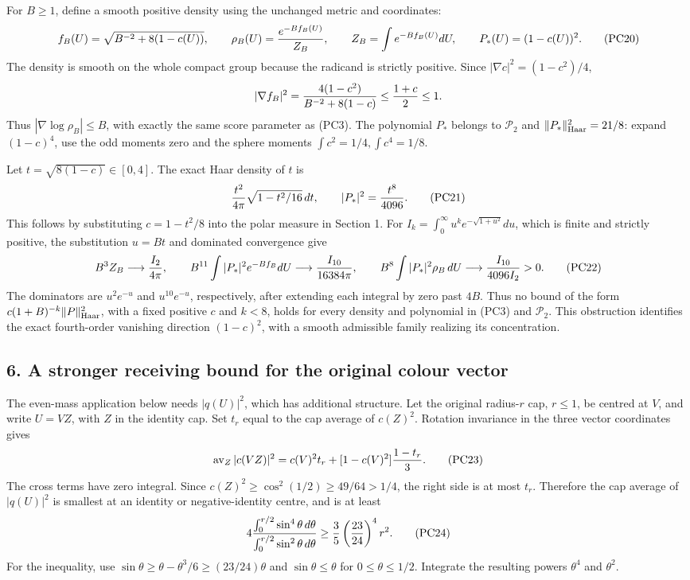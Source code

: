 \documentclass[11pt]{article}
\begin{document}
For \(B\ge1\), define a smooth positive density using the unchanged
metric and coordinates:
\[
 f_B(U)=\sqrt{B^{-2}+8(1-c(U))},\qquad
 \rho_B(U)={e^{-Bf_B(U)}\over Z_B},\qquad
 Z_B=\int e^{-Bf_B(U)}dU,\qquad P_*(U)=(1-c(U))^2.
 \tag{PC20}
\]
The density is smooth on the whole compact group because the radicand
is strictly positive. Since
\(|\nabla c|^2=(1-c^2)/4\),
\[
 |\nabla f_B|^2
 ={4(1-c^2)\over B^{-2}+8(1-c)}
 \le{1+c\over2}\le1.
\]
Thus \(|\nabla\log\rho_B|\le B\), with exactly the same score
parameter as (PC3). The polynomial \(P_*\) belongs to
\(\mathcal P_2\) and \(\|P_*\|_{\rm Haar}^2=21/8\):
expand \((1-c)^4\), use the odd moments zero and the sphere
moments \(\int c^2=1/4,\int c^4=1/8\).

Let \(t=\sqrt{8(1-c)}\in[0,4]\). The exact Haar density of \(t\)
is
\[
 {t^2\over4\pi}\sqrt{1-t^2/16}\,dt,\qquad
 |P_*|^2={t^8\over4096}.
 \tag{PC21}
\]
This follows by substituting \(c=1-t^2/8\) into the polar measure
in Section 1. For \(I_k=\int_0^\infty u^k e^{-\sqrt{1+u^2}}du\),
which is finite and strictly positive, the substitution \(u=Bt\)
and dominated convergence give
\[
 B^3Z_B\longrightarrow {I_2\over4\pi},\qquad
 B^{11}\int|P_*|^2e^{-Bf_B}dU
                  \longrightarrow {I_{10}\over16384\pi},
 \qquad
 B^8\int|P_*|^2\rho_B\,dU
                  \longrightarrow {I_{10}\over4096I_2}>0.
 \tag{PC22}
\]
The dominators are \(u^2e^{-u}\) and \(u^{10}e^{-u}\),
respectively, after extending each integral by zero past \(4B\).
Thus no bound of the form \(c(1+B)^{-k}\|P\|_{\rm Haar}^2\),
with a fixed positive \(c\) and \(k<8\), holds for every density
and polynomial in (PC3) and \(\mathcal P_2\).
This obstruction identifies the exact fourth-order vanishing direction
\((1-c)^2\), with a smooth admissible family realizing its concentration.

\subsection*{6. A stronger receiving bound for the original colour vector}

The even-mass application below needs \(|q(U)|^2\), which has
additional structure. Let the original radius-\(r\) cap, \(r\le1\),
be centred at \(V\), and write \(U=VZ\), with \(Z\) in the identity
cap. Set \(t_r\) equal to the cap average of \(c(Z)^2\).
Rotation invariance in the three vector coordinates gives
\[
 \operatorname{av}_{Z}|c(VZ)|^2
 =c(V)^2t_r+[1-c(V)^2]{1-t_r\over3}.
 \tag{PC23}
\]
The cross terms have zero integral. Since
\(c(Z)^2\ge\cos^2(1/2)\ge49/64>1/4\), the right side is at
most \(t_r\). Therefore the cap average of \(|q(U)|^2\) is
smallest at an identity or negative-identity centre, and is at least
\[
 4{\int_0^{r/2}\sin^4\theta\,d\theta
       \over\int_0^{r/2}\sin^2\theta\,d\theta}
 \ge {3\over5}\left({23\over24}\right)^4r^2 .
 \tag{PC24}
\]
For the inequality, use
\(\sin\theta\ge\theta-\theta^3/6\ge(23/24)\theta\)
and \(\sin\theta\le\theta\) for \(0\le\theta\le1/2\).
Integrate the resulting powers \(\theta^4\) and \(\theta^2\).
\end{document}
